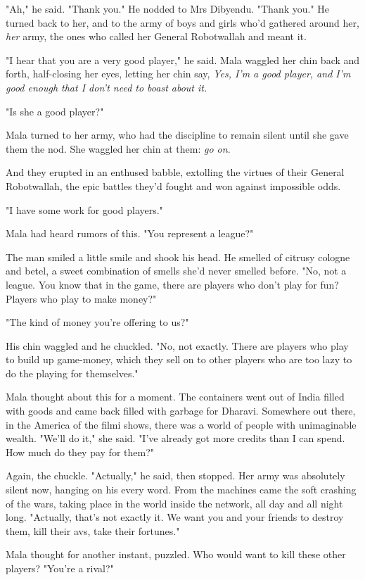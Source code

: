 "Ah," he said. "Thank you." He nodded to Mrs Dibyendu. "Thank you."
He turned back to her, and to the army of boys and girls who'd
gathered around her, \emph{her} army, the ones who called her
General Robotwallah and meant it.

"I hear that you are a very good player," he said. Mala waggled her
chin back and forth, half-closing her eyes, letting her chin say,
\emph{Yes, I'm a good player, and I'm good enough that I don't need to boast about it.}

"Is she a good player?"

Mala turned to her army, who had the discipline to remain silent
until she gave them the nod. She waggled her chin at them:
\emph{go on}.

And they erupted in an enthused babble, extolling the virtues of
their General Robotwallah, the epic battles they'd fought and won
against impossible odds.

"I have some work for good players."

Mala had heard rumors of this. "You represent a league?"

The man smiled a little smile and shook his head. He smelled of
citrusy cologne and betel, a sweet combination of smells she'd
never smelled before. "No, not a league. You know that in the game,
there are players who don't play for fun? Players who play to make
money?"

"The kind of money you're offering to us?"

His chin waggled and he chuckled. "No, not exactly. There are
players who play to build up game-money, which they sell on to
other players who are too lazy to do the playing for themselves."

Mala thought about this for a moment. The containers went out of
India filled with goods and came back filled with garbage for
Dharavi. Somewhere out there, in the America of the filmi shows,
there was a world of people with unimaginable wealth. "We'll do
it," she said. "I've already got more credits than I can spend. How
much do they pay for them?"

Again, the chuckle. "Actually," he said, then stopped. Her army was
absolutely silent now, hanging on his every word. From the machines
came the soft crashing of the wars, taking place in the world
inside the network, all day and all night long. "Actually, that's
not exactly it. We want you and your friends to destroy them, kill
their avs, take their fortunes."

Mala thought for another instant, puzzled. Who would want to kill
these other players? "You're a rival?"

